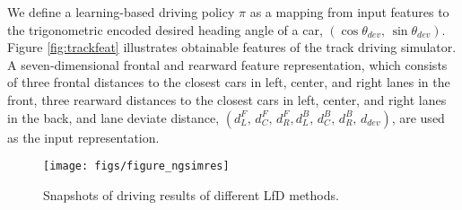\documentclass[letterpaper, 10 pt, conference]{ieeeconf}  %
\begin{document}
We define a learning-based driving policy $\pi$ 
as a mapping from input features to the trigonometric encoded
desired heading angle of a car, 
$(\cos\theta_{dev} , \, \sin \theta_{dev})$.
Figure \ref{fig:trackfeat} illustrates obtainable features of the
track driving simulator.
A seven-dimensional frontal and rearward feature representation, 
which consists of three frontal distances to the closest cars in left, center,
and right lanes in the front, 
three rearward distances to the closest cars in left, center, and right lanes in the back,
and lane deviate distance,
$(d^F_L, \, d^F_C, \, d^F_R, d^B_L, \, d^B_C, \, d^B_R, \, d_{dev})$,
are used as the input representation. 

\begin{figure*}[!t] \centering
	\texttt{[image: figs/figure\_ngsimres]}
	\caption{
		Snapshots of driving results of different LfD methods.  
		}
	\label{fig:ngsimres}
\end{figure*}
\end{document}
